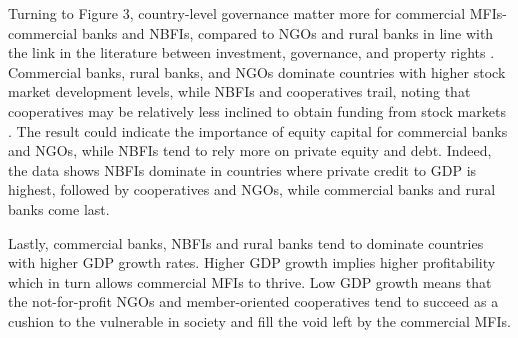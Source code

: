 \documentclass[a4paper,nobind]{templates/ociamthesis}
\begin{document}
Turning to Figure 3, country-level governance matter more for commercial MFIs- commercial banks and NBFIs, compared to NGOs and rural banks in line with the link in the literature between investment, governance, and property rights \autocite{claessens2003financial}. Commercial banks, rural banks, and NGOs dominate countries with higher stock market development levels, while NBFIs and cooperatives trail, noting that cooperatives may be relatively less inclined to obtain funding from stock markets \autocite{porter1987economic}. The result could indicate the importance of equity capital for commercial banks and NGOs, while NBFIs tend to rely more on private equity and debt. Indeed, the data shows NBFIs dominate in countries where private credit to GDP is highest, followed by cooperatives and NGOs, while commercial banks and rural banks come last.

Lastly, commercial banks, NBFIs and rural banks tend to dominate countries with higher GDP growth rates. Higher GDP growth implies higher profitability which in turn allows commercial MFIs to thrive. Low GDP growth means that the not-for-profit NGOs and member-oriented cooperatives tend to succeed as a cushion to the vulnerable in society and fill the void left by the commercial MFIs.

\newpage
\end{document}
